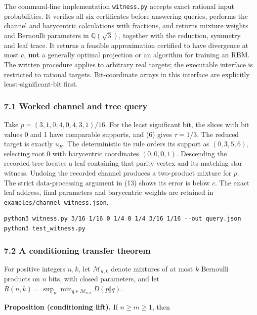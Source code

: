 The command-line implementation \texttt{witness.py} accepts exact
rational input probabilities. It verifies all six certificates before
answering queries, performs the channel and barycentric calculations
with fractions, and returns mixture weights and Bernoulli parameters in
\(\mathbb Q(\sqrt3)\), together with the reduction, symmetry and leaf
trace. It returns a feasible approximation certified to have divergence
at most \(c\), \textbf{not} a generally optimal projection or an
algorithm for training an RBM. The written procedure applies to
arbitrary real targets; the executable interface is restricted to
rational targets. Bit-coordinate arrays in this interface are explicitly
least-significant-bit first.

\subsubsection{7.1 Worked channel and tree
query}\label{worked-channel-and-tree-query}

Take \(p=(3,1,0,4,0,4,3,1)/16\). For the least significant bit, the
slices with bit values 0 and 1 have comparable supports, and (6) gives
\(\tau=1/3\). The reduced target is exactly \(u_E\). The deterministic
tie rule orders its support as \((0,3,5,6)\), selecting root 0 with
barycentric coordinates \((0,0,0,1)\). Descending the recorded tree
locates a leaf containing that parity vertex and its matching star
witness. Undoing the recorded channel produces a two-product mixture for
\(p\). The strict data-processing argument in (13) shows its error is
below \(c\). The exact leaf address, final parameters and barycentric
weights are retained in \texttt{examples/channel-witness.json}.

\begin{verbatim}
python3 witness.py 3/16 1/16 0 1/4 0 1/4 3/16 1/16 --out query.json
python3 test_witness.py
\end{verbatim}

\subsubsection{7.2 A conditioning transfer
theorem}\label{a-conditioning-transfer-theorem}

For positive integers \(n,k\), let \(\mathcal M_{n,k}\) denote mixtures
of at most \(k\) Bernoulli products on \(n\) bits, with closed
parameters, and let
\(R(n,k)=\sup_p\min_{q\in\mathcal M_{n,k}}D(p\Vert q)\).

\textbf{Proposition (conditioning lift).} If \(n\ge m\ge1\), then

